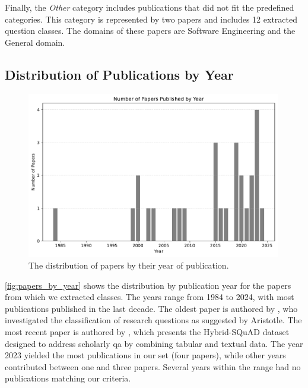 Finally, the \emph{Other} category includes publications that did not fit the predefined categories. This category is represented by two papers and includes 12 extracted question classes. The domains of these papers are Software Engineering and the General domain.

\subsection{Distribution of Publications by Year}

\begin{figure}[t]
    \centering
    \includegraphics[width=0.99\textwidth]{figures/question_catalog/papers_by_year.pdf}
    \caption[Distribution of Papers by Publication Year]{The distribution of papers by their year of publication.}
    \label{fig:papers_by_year}
\end{figure}

\autoref{fig:papers_by_year} shows the distribution by publication year for the papers from which we extracted classes. The years range from 1984 to 2024, with most publications published in the last decade. The oldest paper is authored by \textcite{dillon_classification_1984}, who investigated the classification of research questions as suggested by Aristotle. The most recent paper is authored by \textcite{taffa_hybrid-squad_2024}, which presents the Hybrid-SQuAD dataset designed to address scholarly \gls{qa} by combining tabular and textual data. The year 2023 yielded the most publications in our set (four papers), while other years contributed between one and three papers. Several years within the range had no publications matching our criteria.




